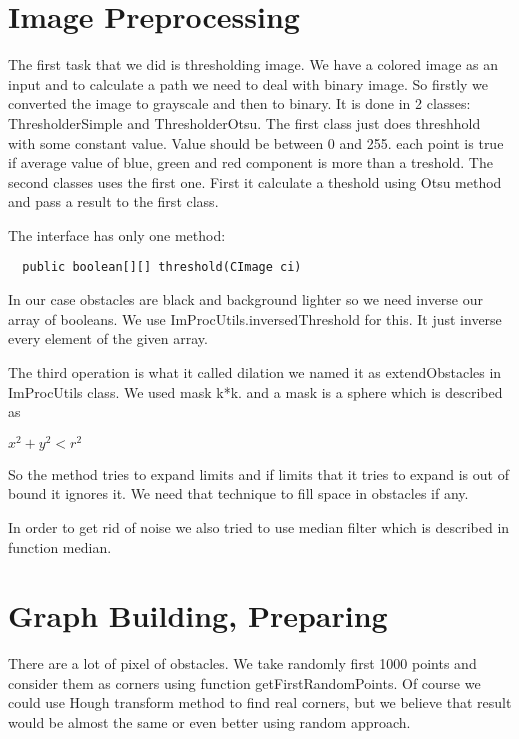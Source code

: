 \documentclass[12pt]{article}
\begin{document}
\maketitle

\section{Image Preprocessing}

The first task that we did is thresholding image. We have a colored image as an input and to calculate a path we need to deal with binary image. So firstly we converted the image to grayscale and then to binary. It is done in 2 classes: ThresholderSimple and ThresholderOtsu. The first class just does threshhold with some constant value. Value should be between 0 and 255. each point is true if average value of blue, green and red component is more than a treshold. The second classes uses the first one. First it calculate a theshold using Otsu method and pass a result to the first class.

The interface has only one method:

\begin{lstlisting}
  public boolean[][] threshold(CImage ci)
\end{lstlisting}

In our case obstacles are black and background lighter so we need inverse our array of booleans. We use ImProcUtils.inversedThreshold for this. It just inverse every element of the given array.

The third operation is what it called dilation we named it as extendObstacles in ImProcUtils class. We used mask k*k. and a mask is a sphere which is described as

$x^2 + y^2 < r^2$

So the method tries to expand limits and if limits that it tries to expand is out of bound it ignores it. We need that technique to fill space in obstacles if any.

In order to get rid of noise we also tried to use median filter which is described in function median.

\section{Graph Building, Preparing}

There are a lot of pixel of obstacles. We take randomly first 1000 points and consider them as corners using function getFirstRandomPoints. Of course we could use Hough transform method to find real corners, but we believe that result would be almost the same or even better using random approach.
\end{document}
